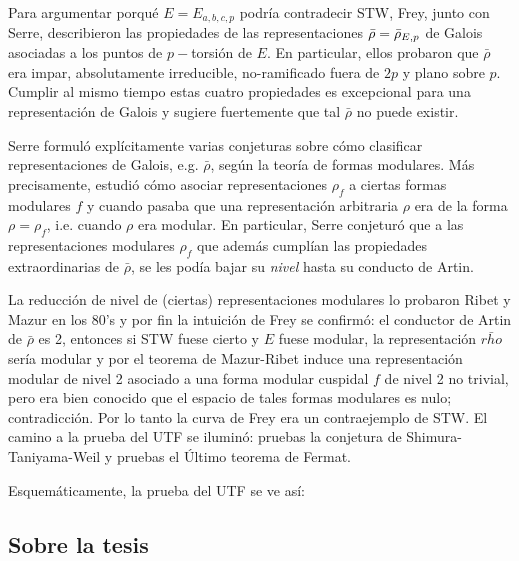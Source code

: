 Para argumentar porqu\'e $E=E_{a,b,c,p}$ podr\'ia contradecir STW, Frey, junto con Serre, describieron
las propiedades de las representaciones $\bar{\rho}=\bar{\rho}_{E,p}$ de Galois asociadas a los puntos de
$p-$torsi\'on de $E$. En particular, ellos probaron que $\bar{\rho}$ era impar, absolutamente
irreducible, no-ramificado fuera de $2p$ y plano sobre $p$. Cumplir al mismo tiempo estas
cuatro propiedades es excepcional para una representaci\'on de Galois y sugiere fuertemente que
tal $\bar{\rho}$ no puede existir.

Serre formul\'o expl\'icitamente varias conjeturas sobre c\'omo clasificar representaciones
de Galois, e.g. $\bar{\rho}$, seg\'un la teor\'ia de formas modulares. M\'as precisamente,
estudi\'o c\'omo asociar representaciones $\rho_f$ a ciertas formas modulares $f$ y cuando
pasaba que una representaci\'on arbitraria $\rho$ era de la forma $\rho=\rho_f$, i.e. cuando
$\rho$ era modular. En particular, Serre conjetur\'o que a las representaciones modulares $\rho_f$
que adem\'as cumpl\'ian las propiedades extraordinarias de $\bar{\rho}$, se les pod\'ia bajar su
\emph{nivel} hasta su conducto de Artin.

La reducci\'on de nivel de (ciertas) representaciones modulares lo probaron Ribet y Mazur en los
80's y por fin la intuici\'on de Frey se confirm\'o: el conductor de Artin de $\bar{\rho}$ es 2,
entonces si STW fuese cierto y $E$ fuese modular, la representaci\'on $\bar{rho}$ ser\'ia modular
y por el teorema de Mazur-Ribet induce una representaci\'on modular de nivel 2 asociado a una
forma modular cuspidal $f$ de nivel 2 no trivial, pero era bien conocido que el espacio de
tales formas modulares es nulo; contradicci\'on. Por lo tanto la curva de Frey era un
contraejemplo de STW. El camino a la prueba del UTF se ilumin\'o: pruebas la conjetura de
Shimura-Taniyama-Weil y pruebas el \'Ultimo teorema de Fermat.

Esquem\'aticamente, la prueba del UTF se ve as\'i:\\


\begingroup
\centering

\endgroup

\subsection*{Sobre la tesis}





\begingroup
\centering

\endgroup

